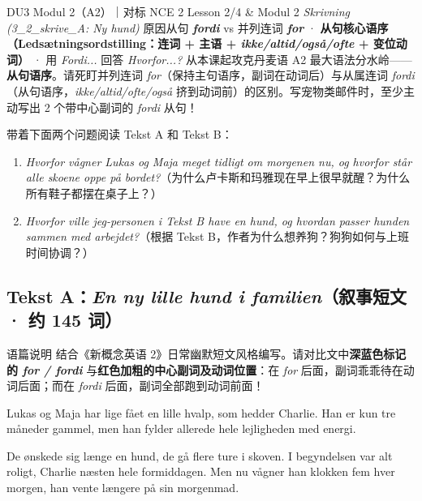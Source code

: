 {DU3 Modul 2（A2）｜对标 NCE 2 Lesson 2/4 \& Modul 2 \textit{Skrivning (3\_2\_skrive\_A: Ny hund)}}
{原因从句 \textbf{\textit{fordi}} vs 并列连词 \textbf{\textit{for}} · \textbf{从句核心语序（Ledsætningsordstilling：连词 + 主语 + \textit{ikke/altid/også/ofte} + 变位动词）} · 用 \textit{Fordi...} 回答 \textit{Hvorfor...?}}
{从本课起攻克丹麦语 A2 最大语法分水岭——\textbf{从句语序}。请死盯并列连词 \textit{for}（保持主句语序，副词在动词后）与从属连词 \textit{fordi}（从句语序，\textit{ikke/altid/ofte/også} 挤到动词前）的区别。写宠物类邮件时，至少主动写出 2 个带中心副词的 \textit{fordi} 从句！}

\begin{foerduleaeser}
带着下面两个问题阅读 Tekst A 和 Tekst B：
\begin{enumerate}
  \item \textit{Hvorfor vågner Lukas og Maja meget tidligt om morgenen nu, og hvorfor står alle skoene oppe på bordet?}（为什么卢卡斯和玛雅现在早上很早就醒？为什么所有鞋子都摆在桌子上？）
  \item \textit{Hvorfor ville jeg-personen i Tekst B have en hund, og hvordan passer hunden sammen med arbejdet?}（根据 Tekst B，作者为什么想养狗？狗狗如何与上班时间协调？）
\end{enumerate}
\end{foerduleaeser}


\subsection*{Tekst A：\textit{En ny lille hund i familien}（叙事短文 · 约 145 词）}

\begin{tipbox}{语篇说明}
结合《新概念英语 2》日常幽默短文风格编写。请对比文中\textbf{\color{NCDNavy}深蓝色标记的 \textit{for / fordi}} 与\textbf{\color{NCDRed}红色加粗的中心副词及动词位置}：在 \textit{for} 后面，副词乖乖待在动词后面；而在 \textit{fordi} 后面，副词全部跑到动词前面！
\end{tipbox}

Lukas og Maja har lige fået en lille hvalp, som hedder Charlie. Han er kun tre måneder gammel, men han fylder allerede hele lejligheden med energi.

De ønskede sig længe en hund,  de  gå flere ture i skoven. I begyndelsen var alt roligt,  Charlie  næsten hele formiddagen. Men nu vågner han klokken fem hver morgen,  han  vente længere på sin morgenmad.

